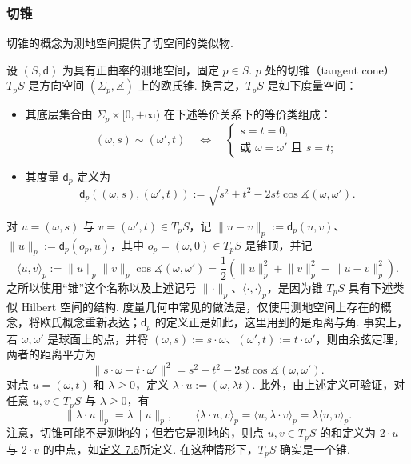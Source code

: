 \subsubsection{切锥}\label{sec:7.3.3}
切锥的概念为测地空间提供了切空间的类似物.
\begin{definition}[切锥]\label{def:7.19}
设 $(S,\mathsf d)$ 为具有正曲率的测地空间，固定 $p\in S$. $p$ 处的切锥（tangent cone）$T_pS$ 是方向空间 $(\Sigma_p,\measuredangle)$ 上的欧氏锥. 换言之，$T_pS$ 是如下度量空间：
\begin{itemize}
\item 其底层集合由 $\Sigma_p\times[0,+\infty)$ 在下述等价关系下的等价类组成：
$$(\omega,s)\sim(\omega',t)\quad\Longleftrightarrow\quad
\begin{cases}s=t=0,\\\text{或 }\omega=\omega'\text{ 且 }s=t;\end{cases}$$
\item 其度量 $\mathsf d_p$ 定义为
$$\mathsf d_p((\omega,s),(\omega',t)):=\sqrt{s^2+t^2-2st\cos\measuredangle(\omega,\omega')}.$$
\end{itemize}
\end{definition}
对 $u=(\omega,s)$ 与 $v=(\omega',t)\in T_pS$，记 $\lVert u-v\rVert_p:=\mathsf d_p(u,v)$、$\lVert u\rVert_p:=\mathsf d_p(o_p,u)$，其中 $o_p=(\omega,0)\in T_pS$ 是锥顶，并记
$$\langle u,v\rangle_p:=\lVert u\rVert_p\lVert v\rVert_p\cos\measuredangle(\omega,\omega')
=\frac12(\lVert u\rVert_p^2+\lVert v\rVert_p^2-\lVert u-v\rVert_p^2).$$
之所以使用“锥”这个名称以及上述记号 $\lVert\cdot\rVert_p$、$\langle\cdot,\cdot\rangle_p$，是因为锥 $T_pS$ 具有下述类似 Hilbert 空间的结构. 度量几何中常见的做法是，仅使用测地空间上存在的概念，将欧氏概念重新表达；$\mathsf d_p$ 的定义正是如此，这里用到的是距离与角. 事实上，若 $\omega,\omega'$ 是球面上的点，并将 $(\omega,s):=s\cdot\omega$、$(\omega',t):=t\cdot\omega'$，则由余弦定理，两者的距离平方为
\begin{equation}\label{eq:7.13}
\lVert s\cdot\omega-t\cdot\omega'\rVert^2=s^2+t^2-2st\cos\measuredangle(\omega,\omega').
\end{equation}
对点 $u=(\omega,t)$ 和 $\lambda\ge0$，定义 $\lambda\cdot u:=(\omega,\lambda t)$. 此外，由上述定义可验证，对任意 $u,v\in T_pS$ 与 $\lambda\ge0$，有
$$\lVert\lambda\cdot u\rVert_p=\lambda\lVert u\rVert_p,
\qquad\langle\lambda\cdot u,v\rangle_p=\langle u,\lambda\cdot v\rangle_p=\lambda\langle u,v\rangle_p.$$
注意，切锥可能不是测地的；但若它是测地的，则点 $u,v\in T_pS$ 的和定义为 $2\cdot u$ 与 $2\cdot v$ 的中点，如\hyperref[prop:7.5]{定义 7.5}所定义. 在这种情形下，$T_pS$ 确实是一个锥.


